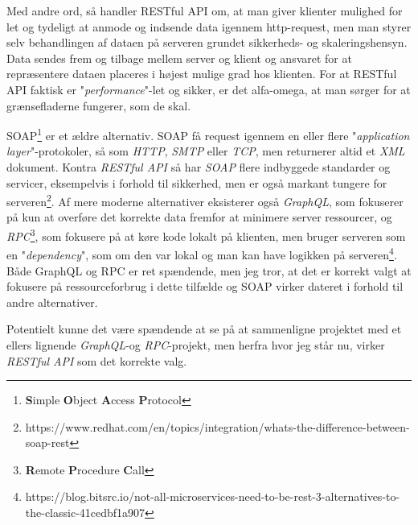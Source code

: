 \documentclass{report}
\begin{document}
Med andre ord, så handler RESTful API om, at man giver klienter mulighed for let og tydeligt at anmode og indsende data igennem http-request, men man styrer selv behandlingen af dataen på serveren grundet sikkerheds- og skaleringshensyn. Data sendes frem og tilbage mellem server og klient og ansvaret for at repræsentere dataen placeres i højest mulige grad hos klienten. For at RESTful API faktisk er "\textit{performance}"-let og sikker, er det alfa-omega, at man sørger for at grænsefladerne fungerer, som de skal.\par{}
SOAP\footnote{\textbf{S}imple \textbf{O}bject \textbf{A}ccess \textbf{P}rotocol} er et ældre alternativ. SOAP få request igennem en eller flere "\textit{application layer}"-protokoler, så som \textit{HTTP}, \textit{SMTP} eller \textit{TCP}, men returnerer altid et \textit{XML} dokument. Kontra \textit{RESTful API} så har \textit{SOAP} flere indbyggede standarder og servicer, eksempelvis i forhold til sikkerhed, men er også markant tungere for serveren\footnote{https://www.redhat.com/en/topics/integration/whats-the-difference-between-soap-rest}. Af mere moderne alternativer eksisterer også \textit{GraphQL}, som fokuserer på kun at overføre det korrekte data fremfor at minimere server ressourcer, og \textit{RPC}\footnote{\textbf{R}emote \textbf{P}rocedure \textbf{C}all}, som fokusere på at køre kode lokalt på klienten, men bruger serveren som en "\textit{dependency}", som om den var lokal og man kan have logikken på serveren\footnote{  https://blog.bitsrc.io/not-all-microservices-need-to-be-rest-3-alternatives-to-the-classic-41cedbf1a907}. Både GraphQL og RPC er ret spændende, men jeg tror, at det er korrekt valgt at fokusere på ressourceforbrug i dette tilfælde og SOAP virker dateret i forhold til andre alternativer.\par{}
Potentielt kunne det være spændende at se på at sammenligne projektet med et ellers lignende \textit{GraphQL}-og \textit{RPC}-projekt, men herfra hvor jeg står nu, virker \textit{RESTful API} som det korrekte valg.
\end{document}
